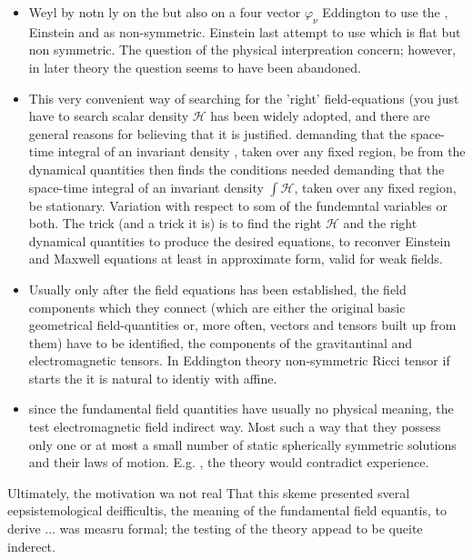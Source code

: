 \documentclass[draft]{article}
\newcommand{\phin}{\ensuremath{\varphi_\nu}\xspace}
\begin{document}
\begin{itemize}
\item Weyl by notn ly on the \gmn but also on a four vector \phin Eddington to use the \Gtmn, Einstein \Gtmn and \gmn as non-symmetric. Einstein last attempt to use \Gtmn which is flat but non symmetric. The question of the physical interpreation concern; however, in later theory the question seems to have been abandoned.
\item This very convenient way of searching for the 'right' field-equations (you just have to search scalar density $\mathcal{H}$ has been widely adopted, and there are general reasons for believing that it is justified. demanding that the space-time integral of an invariant density , taken over any fixed region, be from the dynamical quantities  then finds the conditions needed demanding that the space-time integral of an invariant density $\int \mathcal{H}$, taken over any fixed region, be stationary. Variation with respect to som of the fundemntal variables or both. The trick (and a trick it is) is to find the right $\mathcal{H}$ and the right dynamical quantities to produce the desired equations, to reconver Einstein and Maxwell equations at least in approximate form, valid for weak fields.
\item Usually only after the field equations has been established, the field components which they connect (which are either the original basic geometrical field-quantities or, more often, vectors and tensors built up from them) have to be identified,  the components of the gravitantinal and electromagnetic tensors. In Eddington theory non-symmetric Ricci tensor if starts \gmn the it is natural to identiy with affine\etc.
\item since the fundamental field quantities have usually no physical meaning, the test electromagnetic field indirect way. Most  such a way that they possess only one or at most a small number of static spherically symmetric solutions and their laws of motion. E.g. , the theory would contradict experience.
\end{itemize}

Ultimately, the motivation wa not real 
That this skeme presented sveral eepsistemological deifficultis, the meaning of the fundamental field equantis, to derive ... was measru formal; the testing of the theory appead to be queite inderect. 
\end{document}
